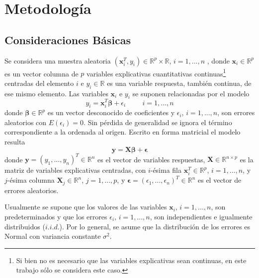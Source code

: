 \documentclass[a4paper,12pt]{report}
\begin{document}
\chapter{Metodología}
\section{Consideraciones Básicas}
Se considera una muestra aleatoria $(\boldsymbol{x}_i^T, y_i) \in \mathbb{R}^p \times \mathbb{R}$, $i=1,...,n$ \citep{tibshiranisparsity}, donde $\boldsymbol{x}_i \in \mathbb{R}^p$ es un vector columna de $p$ variables explicativas cuantitativas continuas\footnote{Si bien no es necesario que las variables explicativas sean continuas, en este trabajo sólo se considera este caso.} centradas del elemento $i$ e $y_i \in \mathbb{R}$ es una variable respuesta, también continua, de ese mismo elemento. Las variables $\boldsymbol{x}_i$ e $y_i$ se suponen relacionadas por el modelo
\begin{equation}
\label{Modelo}
y_i = \boldsymbol{x}^T_i \boldsymbol{\beta}+\epsilon_i \hspace{1cm} i=1,...,n
\end{equation}
donde $\boldsymbol{\beta} \in \mathbb{R}^p$ es un vector desconocido de coeficientes y $\epsilon_i$, $i=1,...,n$, son errores aleatorios con $E(\epsilon_i)=0$. Sin pérdida de generalidad se ignora el término correspondiente a la ordenada al origen. Escrito en forma matricial el modelo resulta
\begin{equation}
\boldsymbol{y}=\boldsymbol{X}\boldsymbol{\beta}+\boldsymbol{\epsilon}
\end{equation} 
donde $\boldsymbol{y}=(y_1,...,y_n)^T \in \mathbb{R}^n$ es el vector de variables respuestas, $\boldsymbol{X} \in \mathbb{R}^{n \times p}$ es la matriz de variables explicativas centradas, con $i$-ésima fila $\boldsymbol{x}_i^T \in \mathbb{R}^p$, $i=1,...,n$, y $j$-ésima columna $\boldsymbol{X}_j \in \mathbb{R}^n$, $j=1,...,p$, y $\boldsymbol{\epsilon}=(\epsilon_1,...,\epsilon_n)^T \in \mathbb{R}^n$ es el vector de errores aleatorios.

Usualmente se supone que los valores de las variables $\boldsymbol{x}_i$, $i=1,...,n$, son predeterminados y que los errores $\epsilon_i$, ${i=1,...,n}$, son independientes e igualmente distribuidos ($i.i.d.$). Por lo general, se asume que la distribución de los errores es Normal con variancia constante $\sigma^2$.
\end{document}

